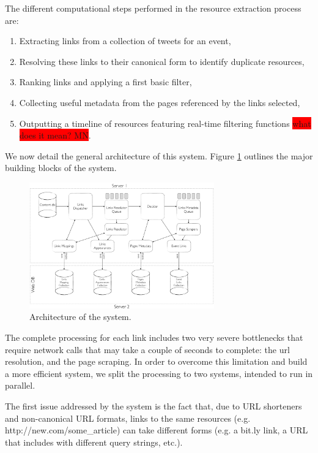 \documentclass{sig-alternate}
\newcommand{\todo}[1]{\colorbox{red}{#1}}
\begin{document}

The different computational steps performed in the resource extraction process are:
\begin{enumerate}
 \item Extracting links from a collection of tweets for an event,
 \item Resolving these links to their canonical form to identify duplicate resources,
 \item Ranking links and applying a first basic filter,
 \item Collecting useful metadata from the pages referenced by the links selected,
 \item Outputting a timeline of resources featuring real-time filtering functions \todo{what does it mean? MN}.
\end{enumerate}

We now detail the general architecture of this system. Figure \ref{fig:architecture} outlines the major building blocks of the system.
\begin{figure}[htbp]
  \centering
  \includegraphics[width=8cm]{Figures/links_processing_architecture.png}
  \caption{Architecture of the system.}
  \label{fig:architecture}
\end{figure}

The complete processing for each link includes two very severe bottlenecks that require network calls that may take a couple of seconds to complete: the url resolution, and the page scraping. In order to overcome this limitation and build a more efficient system, we split the processing to two systems, intended to run in parallel.

The first issue addressed by the system is the fact that, due to URL shorteners and non-canonical URL formats, links to the same resources (e.g. http://new.com/some\_article) can take different forms (e.g. a bit.ly link, a URL that includes with different query strings, etc.).  
\end{document}
